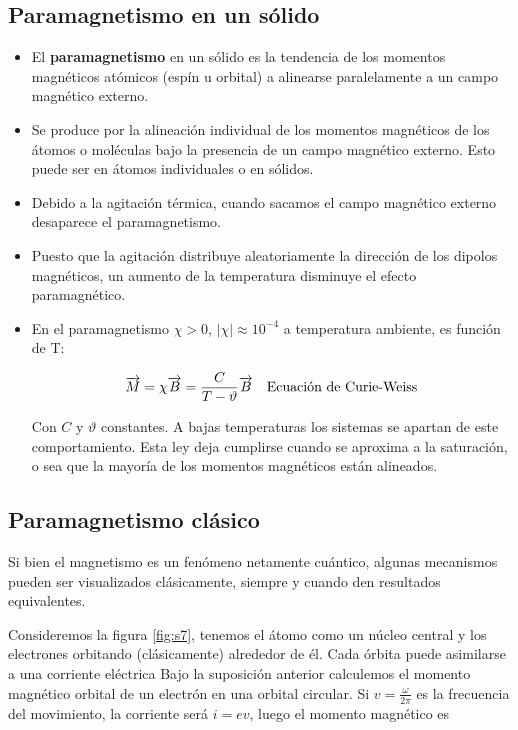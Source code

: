 \subsection{Paramagnetismo en un sólido}


\begin{itemize}
	\item El \textbf{paramagnetismo} en un sólido es la tendencia de los momentos magnéticos atómicos (espín u orbital) a alinearse paralelamente a un campo magnético externo.
	
	\item Se produce por la alineación individual de los momentos magnéticos de los átomos o moléculas bajo la presencia de un campo magnético externo. Esto puede ser en átomos individuales o en sólidos.
	
	\item Debido a la agitación térmica, cuando sacamos el campo magnético externo desaparece el paramagnetismo.
	
	\item Puesto que la agitación distribuye aleatoriamente la dirección de los dipolos magnéticos, un aumento de la temperatura disminuye el efecto paramagnético.
	
	\item En el paramagnetismo $\chi>0$, $|\chi|\approx 10^{-4}$ a temperatura ambiente, es función de T:

	\begin{equation}
  		\overrightarrow{M}=\chi\overrightarrow{B}=\frac{C}{T-\vartheta}\overrightarrow{B} \quad \text{Ecuación de Curie-Weiss}
	\end{equation}

	Con $C$ y $\vartheta$ constantes. A bajas temperaturas los sistemas se apartan de este comportamiento. Esta ley deja cumplirse cuando se aproxima a la saturación, o sea que la mayoría de los momentos magnéticos están alineados.
\end{itemize}


\subsection{Paramagnetismo clásico}

Si bien el magnetismo es un fenómeno netamente cuántico, algunas mecanismos pueden ser visualizados clásicamente, siempre y cuando den resultados equivalentes.

Consideremos la figura \ref{fig:s7}, tenemos el átomo como un núcleo central y los electrones orbitando (clásicamente) alrededor de él. Cada órbita puede asimilarse a una corriente eléctrica Bajo la suposición anterior calculemos el momento magnético orbital de un electrón en una orbital circular. Si $v=\frac{\omega}{2\pi}$ es la frecuencia del movimiento, la corriente será $i=ev$, luego el momento magnético es

